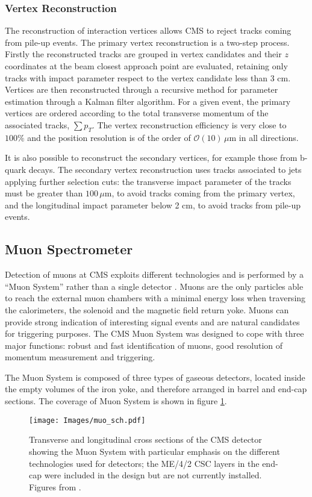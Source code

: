 \subsubsection{Vertex Reconstruction}
The reconstruction of interaction vertices allows CMS
to reject tracks coming from pile-up events. The primary vertex reconstruction is a
two-step process. Firstly the reconstructed tracks are grouped in vertex candidates
and their $z$ coordinates at the beam closest approach point are evaluated, retaining
only tracks with impact parameter respect to the vertex candidate less than 3 cm. Vertices are then reconstructed
through a recursive method for parameter estimation through a Kalman filter \cite{Kal1}
algorithm. For a given event, the primary vertices are ordered according to the
total transverse momentum of the associated tracks, $\sum p_T$. The vertex reconstruction 
efficiency is very close to $100\%$ and the position resolution is of the order of
$\mathcal{O}(10)\,\mu\mathrm{m}$ in all directions.

It is also possible to reconstruct the secondary vertices, for example those from
b-quark decays. The secondary vertex reconstruction uses tracks associated to
jets applying further selection cuts: the transverse impact parameter of the tracks
must be greater than $100\,\mu\mathrm{m}$, to avoid tracks coming from the primary vertex, and the longitudinal impact parameter
below 2 cm, to avoid tracks from pile-up events.

\subsection{Muon Spectrometer}
Detection of muons at CMS exploits different technologies and is performed by
a ``Muon System'' rather than a single detector \cite{muo}. Muons are the only particles 
able to reach the external muon chambers with a minimal energy loss when
traversing the calorimeters, the solenoid and the magnetic field return yoke. Muons can
provide strong indication of interesting signal events and are natural candidates
for triggering purposes. The CMS Muon System was designed to cope with three
major functions: robust and fast identification of muons, good resolution of momentum 
measurement and triggering.

The Muon System is composed of three types of gaseous detectors, located inside
the empty volumes of the iron yoke, and therefore arranged in barrel and end-cap
sections. The coverage of Muon System is shown in figure \ref{muo_sch}.
\begin{figure}
\centering
\texttt{[image: Images/muo\_sch.pdf]}
\caption{Transverse and longitudinal cross sections of the CMS detector showing 
the Muon System with particular emphasis on the different technologies used
for detectors; the ME/4/2 CSC layers in the end-cap were included in the design
but are not currently installed. Figures from \cite{CMS}.}
\label{muo_sch}
\end{figure}

